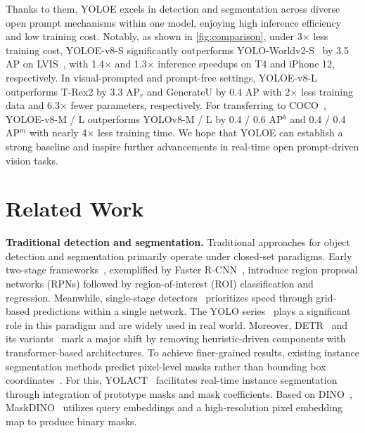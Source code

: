 \documentclass[10pt,twocolumn,letterpaper]{article}
\begin{document}
Thanks to them, YOLOE excels in detection and segmentation across diverse open prompt mechanisms within one model, enjoying high inference efficiency and low training cost. Notably, as shown in \cref{fig:comparison}, under 3$\times$ less training cost, YOLOE-v8-S significantly outperforms YOLO-Worldv2-S~\cite{cheng2024yoloworld} by 3.5 AP on LVIS~\cite{gupta2019lvis}, with 1.4$\times$ and 1.3$\times$ inference speedups on T4 and iPhone 12, respectively. In visual-prompted and prompt-free settings, YOLOE-v8-L outperforms T-Rex2 by 3.3 AP$_r$ and GenerateU by 0.4 AP with 2$\times$ less training data and 6.3$\times$ fewer parameters, respectively. For transferring to COCO~\cite{lin2014mscoco}, YOLOE-v8-M / L outperforms YOLOv8-M / L by 0.4 / 0.6 AP$^b$ and 0.4 / 0.4 AP$^m$ with nearly 4$\times$ less training time. We hope that YOLOE can establish a strong baseline and inspire further advancements in real-time open prompt-driven vision tasks.

\section{Related Work}
\textbf{Traditional detection and segmentation.} Traditional approaches for object detection and segmentation primarily operate under closed-set paradigms. Early two-stage frameworks~\cite{girshick2015fast,ren2015faster,he2017mask,cai2018cascade}, exemplified by Faster R-CNN~\cite{ren2015faster}, introduce region proposal networks (RPNs) followed by region-of-interest (ROI) classification and regression. Meanwhile, single-stage detectors~\cite{liu2016ssd,lin2017focal,tian2019fcos,zhang2020atss,feng2021tood} prioritizes speed through grid-based predictions within a single network. The YOLO series~\cite{redmon2016you,bochkovskiy2020yolov4,li2022yolov6,wang2023yolov7,jocherultralytics,wang2025yolov10} plays a significant role in this paradigm and are widely used in real world. Moreover, DETR~\cite{li2022dndetr} and its variants~\cite{zhu2020deformabledetr,li2022dndetr,zhang2022dino} mark a major shift by removing heuristic-driven components with transformer-based architectures. To achieve finer-grained results, existing instance segmentation methods predict pixel-level masks rather than bounding box coordinates~\cite{he2017mask}. For this, YOLACT~\cite{bolya2019yolact} facilitates real-time instance segmentation through integration of prototype masks and mask coefficients. Based on DINO~\cite{zhang2022dino}, MaskDINO~\cite{li2023maskdino} utilizes query embeddings and a high-resolution pixel embedding map to produce binary masks.
\end{document}
